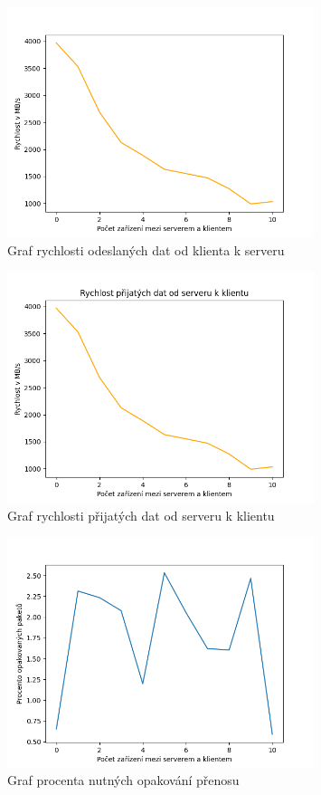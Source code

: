 \begin{figure}[htbp]
    \centering 
    \includegraphics[width=0.8\textwidth]{assets/img/graphs/send_speed.png}
    \caption{Graf rychlosti odeslaných dat od klienta k serveru}
    \label{fig:graph_send_speed}
\end{figure}

\begin{figure}[htbp]
    \centering 
    \includegraphics[width=0.8\textwidth]{assets/img/graphs/receive_speed.png}
    \caption{Graf rychlosti přijatých dat od serveru k klientu}
    \label{fig:graph_receive_speed}
\end{figure}

\begin{figure}[htbp]
    \centering 
    \includegraphics[width=0.8\textwidth]{assets/img/graphs/retransmissions.png}
    \caption{Graf procenta nutných opakování přenosu}
    \label{fig:graph_retransmissions}
\end{figure}


